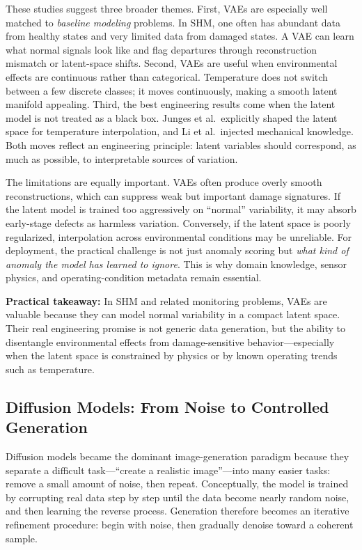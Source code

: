\documentclass[12pt]{article}
\begin{document}
These studies suggest three broader themes. First, VAEs are especially well matched to \emph{baseline modeling} problems. In SHM, one often has abundant data from healthy states and very limited data from damaged states. A VAE can learn what normal signals look like and flag departures through reconstruction mismatch or latent-space shifts. Second, VAEs are useful when environmental effects are continuous rather than categorical. Temperature does not switch between a few discrete classes; it moves continuously, making a smooth latent manifold appealing. Third, the best engineering results come when the latent model is not treated as a black box. Junges et al.\ explicitly shaped the latent space for temperature interpolation, and Li et al.\ injected mechanical knowledge. Both moves reflect an engineering principle: latent variables should correspond, as much as possible, to interpretable sources of variation.

The limitations are equally important. VAEs often produce overly smooth reconstructions, which can suppress weak but important damage signatures. If the latent model is trained too aggressively on ``normal'' variability, it may absorb early-stage defects as harmless variation. Conversely, if the latent space is poorly regularized, interpolation across environmental conditions may be unreliable. For deployment, the practical challenge is not just anomaly scoring but \emph{what kind of anomaly the model has learned to ignore}. This is why domain knowledge, sensor physics, and operating-condition metadata remain essential.

\begin{alert-box}
\textbf{Practical takeaway:} In SHM and related monitoring problems, VAEs are valuable because they can model normal variability in a compact latent space. Their real engineering promise is not generic data generation, but the ability to disentangle environmental effects from damage-sensitive behavior---especially when the latent space is constrained by physics or by known operating trends such as temperature.
\end{alert-box}

\subsection{Diffusion Models: From Noise to Controlled Generation}

Diffusion models became the dominant image-generation paradigm because they separate a difficult task---``create a realistic image''---into many easier tasks: remove a small amount of noise, then repeat. Conceptually, the model is trained by corrupting real data step by step until the data become nearly random noise, and then learning the reverse process. Generation therefore becomes an iterative refinement procedure: begin with noise, then gradually denoise toward a coherent sample.
\end{document}
